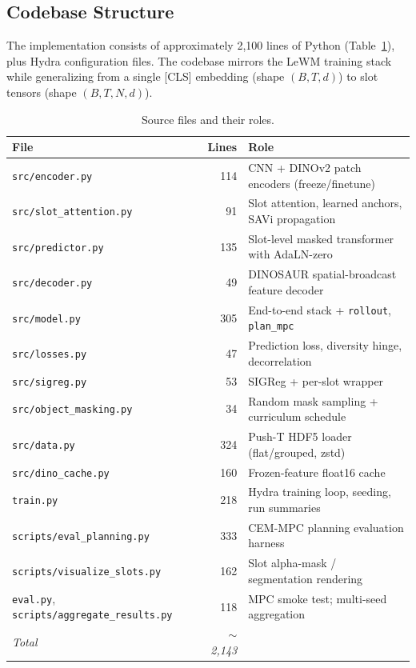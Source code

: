 \documentclass[12pt]{article}
\begin{document}
\subsection{Codebase Structure}

The implementation consists of approximately 2{,}100 lines of Python (Table~\ref{tab:files}), plus Hydra configuration files. The codebase mirrors the LeWM training stack while generalizing from a single [CLS] embedding (shape $(B, T, d)$) to slot tensors (shape $(B, T, N, d)$).

\begin{table}[h]
\centering
\caption{Source files and their roles.}
\begin{tabular}{@{}lrl@{}}
\toprule
\textbf{File} & \textbf{Lines} & \textbf{Role} \\
\midrule
\texttt{src/encoder.py} & 114 & CNN + DINOv2 patch encoders (freeze/finetune) \\
\texttt{src/slot\_attention.py} & 91 & Slot attention, learned anchors, SAVi propagation \\
\texttt{src/predictor.py} & 135 & Slot-level masked transformer with AdaLN-zero \\
\texttt{src/decoder.py} & 49 & DINOSAUR spatial-broadcast feature decoder \\
\texttt{src/model.py} & 305 & End-to-end stack + \texttt{rollout}, \texttt{plan\_mpc} \\
\texttt{src/losses.py} & 47 & Prediction loss, diversity hinge, decorrelation \\
\texttt{src/sigreg.py} & 53 & SIGReg + per-slot wrapper \\
\texttt{src/object\_masking.py} & 34 & Random mask sampling + curriculum schedule \\
\texttt{src/data.py} & 324 & Push-T HDF5 loader (flat/grouped, zstd) \\
\texttt{src/dino\_cache.py} & 160 & Frozen-feature float16 cache \\
\texttt{train.py} & 218 & Hydra training loop, seeding, run summaries \\
\texttt{scripts/eval\_planning.py} & 333 & CEM-MPC planning evaluation harness \\
\texttt{scripts/visualize\_slots.py} & 162 & Slot alpha-mask / segmentation rendering \\
\texttt{eval.py}, \texttt{scripts/aggregate\_results.py} & 118 & MPC smoke test; multi-seed aggregation \\
\midrule
\textit{Total} & \textit{$\sim$2{,}143} & \\
\bottomrule
\end{tabular}
\label{tab:files}
\end{table}
\end{document}
